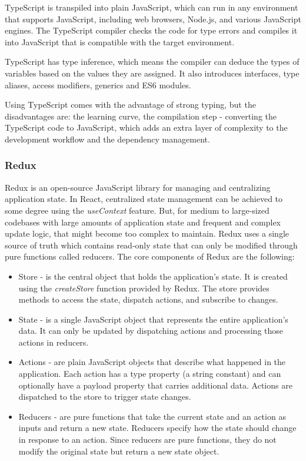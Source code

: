 \par TypeScript is transpiled into plain JavaScript, which can run in any environment that supports JavaScript, including web browsers, Node.js, and various JavaScript engines. The TypeScript compiler checks the code for type errors and compiles it into JavaScript that is compatible with the target environment.

\par TypeScript has type inference, which means the compiler can deduce the types of variables based on the values they are assigned. It also introduces interfaces, type aliases, access modifiers, generics and ES6 modules.

\par Using TypeScript comes with the advantage of strong typing, but the disadvantages are: the learning curve, the compilation step - converting the TypeScript code to JavaScript, which adds an extra layer of complexity to the development workflow and the dependency management.

\subsubsection{Redux}

\par Redux is an open-source JavaScript library for managing and centralizing application state. In React, centralized state management can be achieved to some degree using the \textit{useContext} feature. But, for medium to large-sized codebases with large amounts of application state and frequent and complex update logic, that might become too complex to maintain. Redux uses a single source of truth which contains read-only state that can only be modified through pure functions called reducers. The core components of Redux are the following:

\begin{itemize}
    \item Store - is the central object that holds the application’s state. It is created using the \textit{createStore} function provided by Redux. The store provides methods to access the state, dispatch actions, and subscribe to changes.
    \item State - is a single JavaScript object that represents the entire application’s data. It can only be updated by dispatching actions and processing those actions in reducers.
    \item Actions - are plain JavaScript objects that describe what happened in the application. Each action has a type property (a string constant) and can optionally have a payload property that carries additional data. Actions are dispatched to the store to trigger state changes.
    \item Reducers - are pure functions that take the current state and an action as inputs and return a new state. Reducers specify how the state should change in response to an action. Since reducers are pure functions, they do not modify the original state but return a new state object.
\end{itemize}

